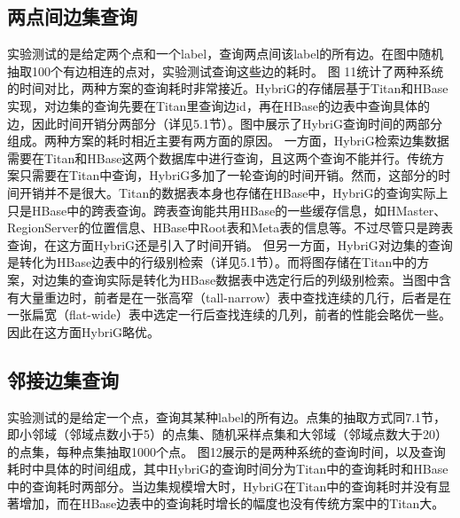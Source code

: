 \subsection{两点间边集查询}
实验测试的是给定两个点和一个label，查询两点间该label的所有边。在图中随机抽取100个有边相连的点对，实验测试查询这些边的耗时。
图 11统计了两种系统的时间对比，两种方案的查询耗时非常接近。HybriG的存储层基于Titan和HBase实现，对边集的查询先要在Titan里查询边id，再在HBase的边表中查询具体的边，因此时间开销分两部分（详见5.1节）。图中展示了HybriG查询时间的两部分组成。两种方案的耗时相近主要有两方面的原因。
一方面，HybriG检索边集数据需要在Titan和HBase这两个数据库中进行查询，且这两个查询不能并行。传统方案只需要在Titan中查询，HybriG多加了一轮查询的时间开销。然而，这部分的时间开销并不是很大。Titan的数据表本身也存储在HBase中，HybriG的查询实际上只是HBase中的跨表查询。跨表查询能共用HBase的一些缓存信息，如HMaster、RegionServer的位置信息、HBase中Root表和Meta表的信息等。不过尽管只是跨表查询，在这方面HybriG还是引入了时间开销。
但另一方面，HybriG对边集的查询是转化为HBase边表中的行级别检索（详见5.1节）。而将图存储在Titan中的方案，对边集的查询实际是转化为HBase数据表中选定行后的列级别检索。当图中含有大量重边时，前者是在一张高窄（tall-narrow）表中查找连续的几行，后者是在一张扁宽（flat-wide）表中选定一行后查找连续的几列，前者的性能会略优一些。因此在这方面HybriG略优。
\subsection{邻接边集查询}
实验测试的是给定一个点，查询其某种label的所有边。点集的抽取方式同7.1节，即小邻域（邻域点数小于5）的点集、随机采样点集和大邻域（邻域点数大于20）的点集，每种点集抽取1000个点。
图12展示的是两种系统的查询时间，以及查询耗时中具体的时间组成，其中HybriG的查询时间分为Titan中的查询耗时和HBase中的查询耗时两部分。当边集规模增大时，HybriG在Titan中的查询耗时并没有显著增加，而在HBase边表中的查询耗时增长的幅度也没有传统方案中的Titan大。

